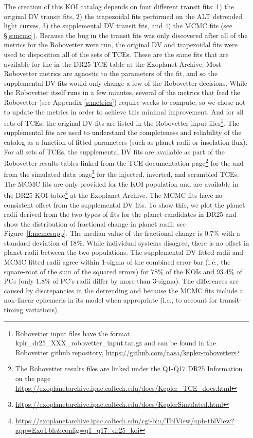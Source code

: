 The creation of this KOI catalog depends on four different transit fits: 1) the original DV transit fits, 2) the trapezoidal fits performed on the ALT \citet{Garcia2010} detrended light curves, 3) the supplemental DV transit fits, and 4) the MCMC fits (see \S\ref{s:mcmc}).  Because the bug in the transit fits was only discovered after all of the metrics for the Robovetter were run, the original DV and trapezoidal fits were used to disposition all of the sets of TCEs. These are the same fits that are available for the  in the DR25 TCE table at the Exoplanet Archive. Most Robovetter metrics are agnostic to the parameters of the fit, and so the supplemental DV fits would only change a few of the Robovetter decisions. While the Robovetter itself runs in a few minutes, several of the metrics that feed the Robovetter (see Appendix \ref{s:metrics}) require weeks to compute, so we chose not to update the metrics in order to achieve this minimal improvement. And for all sets of TCEs, the original DV fits are listed in the Robovetter input files\footnote{Robovetter input files have the format kplr\_dr25\_XXX\_robovetter\_input.tar.gz and can be found in the Robovetter github repository, \url{https://github.com/nasa/kepler-robovetter}}. The supplemental fits are used to understand the completeness and reliability of the catalog as a function of fitted parameters (such as planet radii or insolation flux). For all sets of TCEs, the supplemental DV fits are available as part of the Robovetter results tables linked from the TCE documentation page\footnote{The Robovetter results files are linked under the Q1-Q17 DR25 Information on the page \url{https://exoplanetarchive.ipac.caltech.edu/docs/Kepler\_TCE\_docs.html}} for the  and from the simulated data page\footnote{\url{https://exoplanetarchive.ipac.caltech.edu/docs/KeplerSimulated.html}} \citep[see][]{Christiansen2017,Coughlin2017a} for the injected, inverted, and scrambled TCEs. The MCMC fits are only provided for the KOI population and are available in the DR25 KOI table\footnote{\url{https://exoplanetarchive.ipac.caltech.edu/cgi-bin/TblView/nph-tblView?app=ExoTbls\&config=q1\_q17\_dr25\_koi}} at the Exoplanet Archive. The MCMC fits have no consistent offset from the supplemental DV fits.  To show this, we plot the planet radii derived from the two types of fits for the planet candidates in DR25 and show the distribution of fractional change in planet radii; see Figure~\ref{f:mcmcsupp}. The median value of the fractional change is 0.7\% with a standard deviation of 18\%. While individual systems disagree, there is no offset in planet radii between the two populations. The supplemental DV fitted radii and MCMC fitted radii agree within 1-sigma of the combined error bar (i.e., the square-root of the sum of the squared errors) for 78\% of the KOIs and 93.4\% of PCs (only 1.8\% of PC's radii differ by more than 3-sigma).  The differences are caused by discrepancies in the detrending and because the MCMC fits include a non-linear ephemeris in its model when appropriate (i.e., to account for transit-timing variations).

